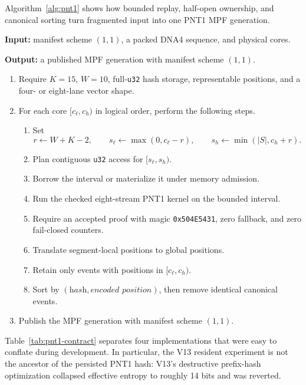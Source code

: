 Algorithm~\ref{alg:pnt1} shows how bounded replay, half-open ownership, and
canonical sorting turn fragmented input into one PNT1 MPF generation.

\begin{algorithm}[H]
\caption{PNT1 MPF replay over fragmented packed storage}
\label{alg:pnt1}
\small
\textbf{Input:} manifest scheme \((1,1)\), a packed DNA4 sequence, and
physical cores.

\textbf{Output:} a published MPF generation with manifest scheme \((1,1)\).

\begin{enumerate}
  \item Require \(K=15\), \(W=10\), full-\texttt{u32} hash storage, representable
    positions, and a four- or eight-lane vector shape.
  \item For each core \([c_\ell,c_h)\) in logical order, perform the following
    steps.
    \begin{enumerate}
      \item Set
        \[
          r\gets W+K-2,\qquad
          s_\ell\gets\max(0,c_\ell-r),\qquad
          s_h\gets\min(|S|,c_h+r).
        \]
      \item Plan contiguous \texttt{u32} access for \([s_\ell,s_h)\).
      \item Borrow the interval or materialize it under memory admission.
      \item Run the checked eight-stream PNT1 kernel on the bounded interval.
      \item Require an accepted proof with magic
        \texttt{0x504E5431}, zero fallback, and zero fail-closed counters.
      \item Translate segment-local positions to global positions.
      \item Retain only events with positions in \([c_\ell,c_h)\).
      \item Sort by \((\textit{hash},\textit{encoded position})\), then remove
        identical canonical events.
    \end{enumerate}
  \item Publish the MPF generation with manifest scheme \((1,1)\).
\end{enumerate}
\end{algorithm}

Table~\ref{tab:pnt1-contract} separates four implementations that were easy to
conflate during development.  In particular, the V13 resident experiment is
not the ancestor of the persisted PNT1 hash: V13's destructive prefix-hash
optimization collapsed effective entropy to roughly 14 bits and was reverted.

